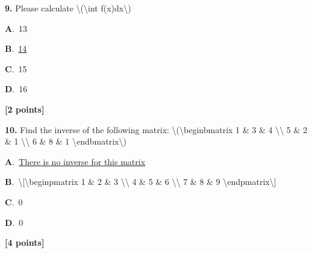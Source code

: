 \documentclass[12pt]{article}
\newcommand{\choice}[3]{%
  \noindent\textbf{#1}.~#2\hfill#3\par\vspace{0.25em}
}
\begin{document}
\noindent \textbf{\textenglish{9.}} {\textenglish{Please calculate \textbackslash{}(\textbackslash{}int f(x)dx\textbackslash{})}}

\noindent\choice{A}{{\textenglish{13}}}{}
\noindent\choice{B}{\underline{{\textenglish{14}}}}{}
\noindent\choice{C}{{\textenglish{15}}}{}
\noindent\choice{D}{{\textenglish{16}}}{}
\hfill \textbf{[2 points]}\vspace{0.5em}

\noindent \textbf{\textenglish{10.}} {\textenglish{Find the inverse of the following matrix: \textbackslash{}(\textbackslash{}begin{bmatrix} 1 \& 3 \& 4 \textbackslash{}\textbackslash{} 5 \& 2 \& 1 \textbackslash{}\textbackslash{} 6 \& 8 \& 1 \textbackslash{}end{bmatrix}\textbackslash{})}}

\noindent\choice{A}{\underline{{\textenglish{There is no inverse for this matrix}}}}{}
\noindent\choice{B}{{\textenglish{\textbackslash{}[\textbackslash{}begin{pmatrix} 1 \& 2 \& 3 \textbackslash{}\textbackslash{} 4 \& 5 \& 6 \textbackslash{}\textbackslash{} 7 \& 8 \& 9  \textbackslash{}end{pmatrix}\textbackslash{}]}}}{}
\noindent\choice{C}{{\textenglish{0}}}{}
\noindent\choice{D}{{\textenglish{0}}}{}
\hfill \textbf{[4 points]}\vspace{0.5em}
\end{document}
